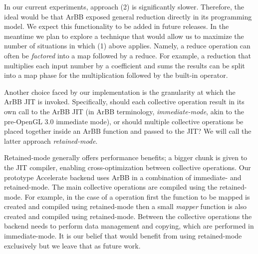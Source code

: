 In our current experiments, approach (2) is significantly slower.
Therefore, the ideal would be that ArBB exposed general reduction
directly in its programming model.  We expect this functionality to be
added in future releases.  In the meantime we plan to explore a
technique that would allow us to maximize the number of situations in
which (1) above applies.  Namely, a reduce operation can often be {\em
  factored} into a map followed by a reduce.  For example, a reduction
that multiplies each input number by a coefficient and sums the
results can be split into a map phase for the multiplication followed
by the built-in  operator.



Another choice faced by our implementation is the granularity at which the
ArBB JIT is invoked.  Specifically, should each collective operation result in its
own call to the ArBB JIT (in ArBB terminology, {\em
  immediate-mode}, akin to the pre-OpenGL 3.0 immediate mode), or
should multiple collective operations be placed together
inside an ArBB function and passed to the JIT?
We will call the latter approach {\em retained-mode}.


Retained-mode generally offers performance benefits; a bigger 
chunk is given to the JIT compiler, enabling cross-optimization
between collective operations. 
Our prototype Accelerate backend uses 
ArBB in  
a combination of immediate- and retained-mode. The main collective 
operations are compiled using the retained-mode. For example, in the case 
of a   operation first the function to be mapped is created and 
compiled using retained-mode then a small {\em mapper} function is 
also created and compiled using retained-mode. 
Between the collective operations the backend
needs to perform data management and copying, which 
are performed in immediate-mode. It is our belief that 
\systemname{} would benefit from using retained-mode exclusively 
but we leave that as future work. 





